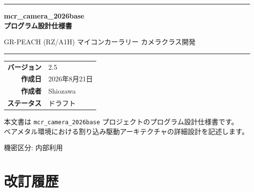\documentclass[a4paper,11pt,dvipdfmx]{jsarticle}
\newcommand{\docversion}{2.5}
\newcommand{\docdate}{2026年8月21日}
\newcommand{\doctitle}{mcr\_camera\_2026base\\プログラム設計仕様書}
\newcommand{\docsubtitle}{GR-PEACH (RZ/A1H) マイコンカーラリー カメラクラス開発}
\newcommand{\docauthor}{Shiozawa}
\begin{document}
\begin{titlepage}
\begin{center}
\vspace*{30mm}

{\color{accentblue}\rule{\textwidth}{2pt}}
\vspace{8mm}

{\Huge\bfseries\color{headerblue} \doctitle}

\vspace{6mm}

{\Large\color{accentblue} \docsubtitle}

\vspace{4mm}
{\color{accentblue}\rule{\textwidth}{2pt}}

\vspace{20mm}

\begin{tabular}{rl}
  \textbf{バージョン} & \docversion \\[4pt]
  \textbf{作成日}     & \docdate \\[4pt]
  \textbf{作成者}     & \docauthor \\[4pt]
  \textbf{ステータス} & ドラフト \\
\end{tabular}

\vfill

\begin{tcolorbox}[
  colback=lightgray,
  colframe=headerblue,
  width=0.8\textwidth,
  arc=3mm,
  halign=center,
]
\small
本文書は \texttt{mcr\_camera\_2026base} プロジェクトのプログラム設計仕様書です。\\
ベアメタル環境における割り込み駆動アーキテクチャの詳細設計を記述します。
\end{tcolorbox}

\vspace{10mm}
{\small\color{gray} 機密区分: 内部利用}

\end{center}
\end{titlepage}

\newpage
\section*{改訂履歴}
\end{document}
